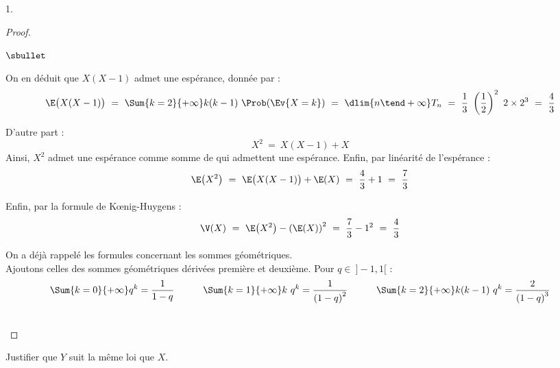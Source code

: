 \begin{noliste}{1.}
\begin{proof}
\begin{noliste}{$\sbullet$}
    \item On en déduit que $X(X-1)$ admet une espérance, donnée par :
      \[
      \E\big( X(X-1) \big) \ = \ \Sum{k=2}{+\infty} k(k-1) \
      \Prob(\Ev{X = k}) \ = \ \dlim{n \tend +\infty} T_n \ = \
      \dfrac{1}{3} \ \left(\dfrac{1}{2} \right)^2 \ 2 \times 2^3 \ = \
      \dfrac{4}{3} 
      \]
      \conc{$\E\big( X(X-1) \big) = \dfrac{4}{3}$}

    \item D'autre part :
      \[
      X^2 \ = \ X(X-1) + X
      \]
      Ainsi, $X^2$ admet une espérance comme somme de \var qui
      admettent une espérance. Enfin, par linéarité de l'espérance :
      \[
      \E\big( X^2 \big) \ = \ \E\big( X(X-1) \big) + \E(X) \ = \
      \dfrac{4}{3} + 1 \ = \ \dfrac{7}{3}
      \]

    \item Enfin, par la formule de K\oe{}nig-Huygens :
      \[
      \V(X) \ = \ \E\big( X^2 \big) - \left( \E(X) \right)^2 \ = \
      \dfrac{7}{3} - 1^2 \ = \ \dfrac{4}{3}
      \]
      \conc{$\V(X) \ = \ \dfrac{4}{3}$}
    \end{noliste}
    \begin{remark}%
      On a déjà rappelé les formules concernant les sommes
      géométriques.\\
      Ajoutons celles des sommes géométriques dérivées première et
      deuxième. Pour $q \in \ ]-1, 1[$ :
      \[
      \Sum{k = 0}{+\infty} q^k = \dfrac{1}{1-q}%
      \quad\qquad \Sum{k = 1}{+\infty} k \ q^k = \dfrac{1}{\left(
          1-q \right)^2}%
      \quad\qquad \Sum{k = 2}{+\infty} k(k-1) \ q^k =
      \dfrac{2}{\left( 1-q \right)^3}%
      \]      
    \end{remark}~\\[-1.3cm]
  \end{proof}

\item Justifier que $Y$ suit la même loi que $X$.


\end{noliste}
